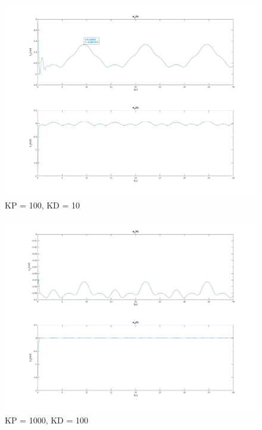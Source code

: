 \documentclass[12pt,a4paper]{article}
\begin{document}
  \begin{figure}[ht]
    \centering
    \includegraphics[width=1\textwidth]{figures/qui100.jpg}
    \caption{KP = 100, KD = 10}
  \end{figure}

  \begin{figure}[ht]
    \centering
    \includegraphics[width=1\textwidth]{figures/qui1000.jpg}
    \caption{KP = 1000, KD = 100}
  \end{figure}
\end{document}
